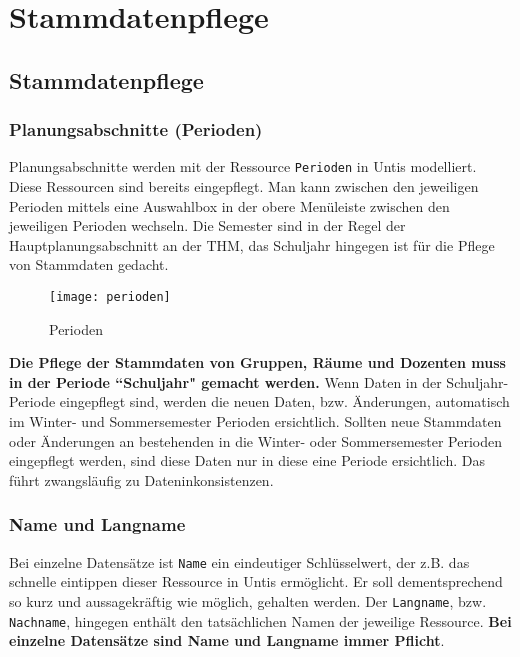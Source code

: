 
\chapter{Stammdatenpflege}
\label{chap:data}

\section{Stammdatenpflege}

\subsection{Planungsabschnitte (Perioden)}

Planungsabschnitte werden mit der Ressource \texttt{Perioden} in Untis modelliert. Diese Ressourcen sind bereits eingepflegt. Man kann zwischen den jeweiligen Perioden mittels eine Auswahlbox in der obere Menüleiste zwischen den jeweiligen Perioden wechseln. Die Semester sind in der Regel der Hauptplanungsabschnitt an der THM, das Schuljahr hingegen ist für die Pflege von Stammdaten gedacht.\\

\begin{wrapfigure}{r}{0.25\textwidth}
	\vspace{-14pt}
	\texttt{[image: perioden]}
	\vspace{-15pt}
	\caption{Perioden}
	\label{fig:mf-sg}
\end{wrapfigure}

\noindent
\textbf{Die Pflege der Stammdaten von Gruppen, Räume und Dozenten muss in der Periode ``Schuljahr" gemacht werden.} Wenn Daten in der Schuljahr-Periode eingepflegt sind, werden die neuen Daten, bzw. Änderungen, automatisch im Winter- und Sommersemester Perioden ersichtlich. Sollten neue Stammdaten oder Änderungen an bestehenden in die Winter- oder Sommersemester Perioden eingepflegt werden, sind diese Daten nur in diese eine Periode ersichtlich. Das führt zwangsläufig zu Dateninkonsistenzen.

\subsection{Name und Langname}

Bei einzelne Datensätze ist \texttt{Name} ein eindeutiger Schlüsselwert, der z.B. das schnelle eintippen dieser Ressource in Untis ermöglicht. Er soll dementsprechend so kurz und aussagekräftig wie möglich, gehalten werden. Der \texttt{Langname}, bzw. \texttt{Nachname}, hingegen enthält den tatsächlichen Namen der jeweilige Ressource. \textbf{Bei einzelne Datensätze sind Name und Langname immer Pflicht}.

